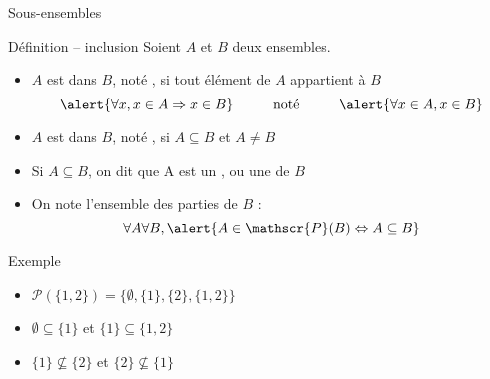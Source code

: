 
\begingroup

\begin{frame}{Sous-ensembles}
  \begin{block}{Définition -- inclusion}
    Soient $A$ et $B$ deux ensembles.
    \begin{itemize}
    \item $A$ est  dans $B$, noté , si tout élément de $A$ appartient à $B$
      $$\alert{\forall x, x \in A \Rightarrow x\in B}  \hspace{1cm}\text{noté} \hspace{1cm} \alert{\forall x \in A, x\in B}$$
    \item $A$ est  dans $B$, noté , si \alert{$A \subseteq B$ et $A \neq B$}
    \item Si $A\subseteq B$, on dit que A est un , ou une  de $B$
    \item On note  l'ensemble des parties de $B$ :
      $$\forall A\forall B, \alert{A \in \mathscr{P}(B) \Leftrightarrow A\subseteq B}$$
    \end{itemize}
  \end{block}

  \vspace{-3mm}
  \begin{exampleblock}{Exemple}
    \begin{itemize}
    \item $\mathscr{P}(\{1, 2\}) = \{ \emptyset, \{1\}, \{2\}, \{1, 2\}\}$
    \item $\emptyset \subseteq \{1\}$ et $\{1\} \subseteq \{1, 2\}$
    \item $\{1\} \nsubseteq \{2\}$ et $\{2\} \nsubseteq \{1\}$
    \end{itemize}
  \end{exampleblock}
\end{frame}

\endgroup
